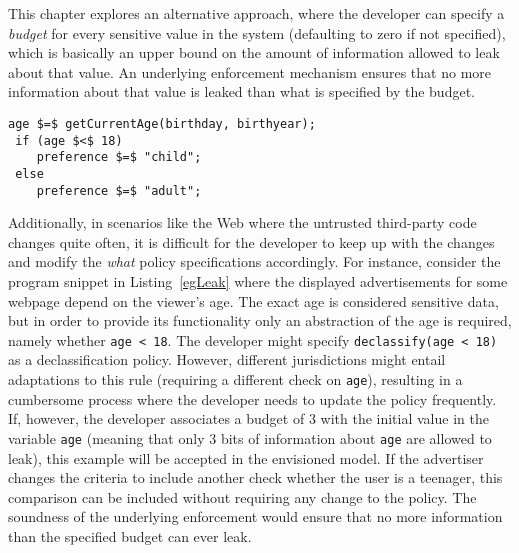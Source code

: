 
This chapter explores an alternative approach, where the developer can
specify a \emph{budget} for every sensitive value in the system
(defaulting to zero if not specified), which is basically an upper
bound on the amount of information allowed to leak about that
value. An underlying enforcement mechanism ensures that no more
information about that value is leaked than what is specified by the
budget.  

\begin{lstlisting}[float,belowskip=-0.5em,caption=Age-based Advertisement, label=egLeak]
 age $=$ getCurrentAge(birthday, birthyear);
 if (age $<$ 18)
    preference $=$ "child";
 else
    preference $=$ "adult";
\end{lstlisting}

Additionally, in scenarios
like the Web where the untrusted third-party code changes quite often,
it is difficult for the developer to keep up with the changes and
modify the \emph{what} policy specifications accordingly. For
instance, consider the program snippet in Listing~\ref{egLeak} where
the displayed advertisements for some webpage depend on the viewer's
age. The exact age is considered sensitive data, but in order to
provide its functionality only  an abstraction of the age is required,
namely whether \lstinline{age < 18}. The developer might specify
\lstinline{declassify(age < 18)} as a declassification policy.
However, different jurisdictions might entail adaptations to this rule  
(requiring a different check on \lstinline{age}), resulting in a
cumbersome process where the developer needs to update the policy
frequently. If, however, the developer associates a budget of $3$ with
the initial value in the variable \lstinline{age} (meaning that only
$3$ bits of information about \lstinline{age} are allowed to leak),
this example will be accepted in the envisioned model. If the
advertiser changes the criteria to include another check whether the
user is a teenager, this comparison can be included without requiring 
any change to the policy. The soundness of the underlying enforcement 
would ensure that no more information than the specified budget can
ever leak.  


